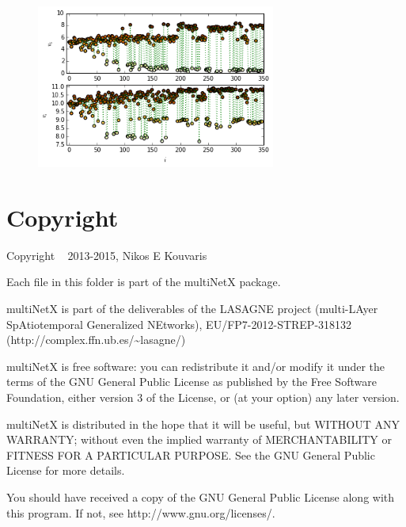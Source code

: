 \documentclass[11pt]{article}
\begin{document}
\begin{figure}[h!]
\centering
\includegraphics[width=0.7\textwidth]{multiplex_turing_patterns_27_0.png}
\end{figure}


\pagebreak

\section{Copyright}\label{copyright}

Copyright \textcopyright~ 2013-2015, Nikos E Kouvaris


\vspace{10pt}
\noindent Each file in this folder is part of the multiNetX package.

\vspace{10pt}
\noindent multiNetX is part of the deliverables of the LASAGNE project
(multi-LAyer SpAtiotemporal Generalized NEtworks),
EU/FP7-2012-STREP-318132
(http://complex.ffn.ub.es/\textasciitilde{}lasagne/)

\vspace{10pt}
\noindent multiNetX is free software: you can redistribute it and/or modify it
under the terms of the GNU General Public License as published by the
Free Software Foundation, either version 3 of the License, or (at your
option) any later version.

\vspace{10pt}
\noindent multiNetX is distributed in the hope that it will be useful, but WITHOUT
ANY WARRANTY; without even the implied warranty of MERCHANTABILITY or
FITNESS FOR A PARTICULAR PURPOSE. See the GNU General Public License for
more details.

\vspace{10pt}
\noindent You should have received a copy of the GNU General Public License along
with this program. If not, see http://www.gnu.org/licenses/.
\end{document}
